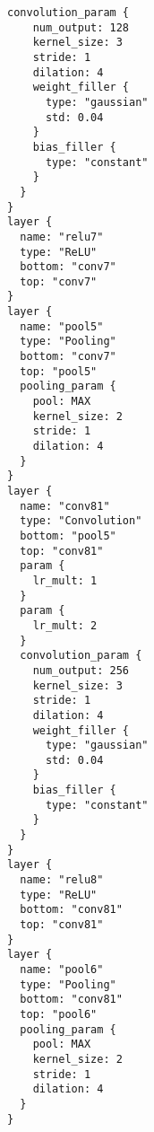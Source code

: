 \begin{appendices}
\begin{lstlisting}[caption=segUSK.prototxt]
  convolution_param {
    num_output: 128
    kernel_size: 3
    stride: 1
    dilation: 4
    weight_filler {
      type: "gaussian"
      std: 0.04
    }
    bias_filler {
      type: "constant"
    }
  }
}
layer {
  name: "relu7"
  type: "ReLU"
  bottom: "conv7"
  top: "conv7"
}
layer {
  name: "pool5"
  type: "Pooling"
  bottom: "conv7"
  top: "pool5"
  pooling_param {
    pool: MAX
    kernel_size: 2
    stride: 1
    dilation: 4
  }
}
layer {
  name: "conv81"
  type: "Convolution"
  bottom: "pool5"
  top: "conv81"
  param {
    lr_mult: 1
  }
  param {
    lr_mult: 2
  }
  convolution_param {
    num_output: 256
    kernel_size: 3
    stride: 1
    dilation: 4
    weight_filler {
      type: "gaussian"
      std: 0.04
    }
    bias_filler {
      type: "constant"
    }
  }
}
layer {
  name: "relu8"
  type: "ReLU"
  bottom: "conv81"
  top: "conv81"
}
layer {
  name: "pool6"
  type: "Pooling"
  bottom: "conv81"
  top: "pool6"
  pooling_param {
    pool: MAX
    kernel_size: 2
    stride: 1
    dilation: 4
  }
}


\end{lstlisting}
\end{appendices}
